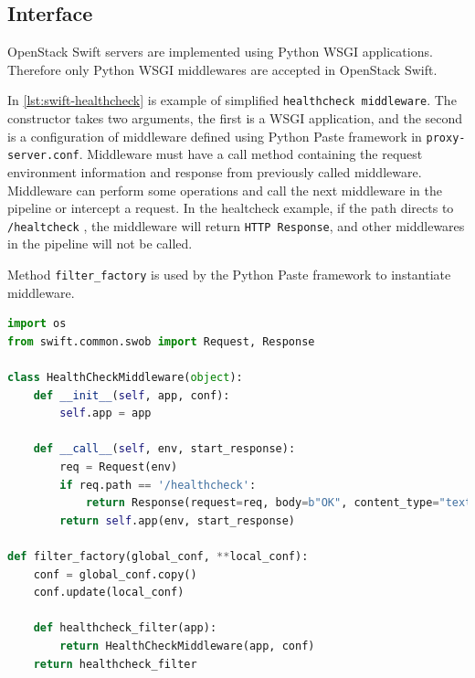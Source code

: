     \subsection{Interface}
    OpenStack Swift servers are implemented using Python WSGI applications. Therefore only Python WSGI middlewares are accepted in OpenStack Swift.

    In \ref{lst:swift-healthcheck} is example of simplified \texttt{healthcheck middleware}. The constructor takes two arguments, the first is a WSGI application, and the second is a configuration of middleware defined using Python Paste framework in \texttt{proxy-server.conf}. Middleware must have a call method containing the request environment information and response from previously called middleware. Middleware can perform some operations and call the next middleware in the pipeline or intercept a request. In the healtcheck example, if the path directs to \texttt{/healtcheck} , the middleware will return \texttt{HTTP Response}, and other middlewares in the pipeline will not be called.

    Method \texttt{filter\_factory} is used by the Python Paste framework to instantiate middleware.

\begin{lstlisting}[language=Python, style=pythonStyle, caption=Example of healthcheck middleware in OpenStack Swift, label=lst:swift-healthcheck]
import os
from swift.common.swob import Request, Response

class HealthCheckMiddleware(object):
    def __init__(self, app, conf):
        self.app = app

    def __call__(self, env, start_response):
        req = Request(env)
        if req.path == '/healthcheck':
            return Response(request=req, body=b"OK", content_type="text/plain")(env, start_response)
        return self.app(env, start_response)

def filter_factory(global_conf, **local_conf):
    conf = global_conf.copy()
    conf.update(local_conf)

    def healthcheck_filter(app):
        return HealthCheckMiddleware(app, conf)
    return healthcheck_filter
\end{lstlisting}

